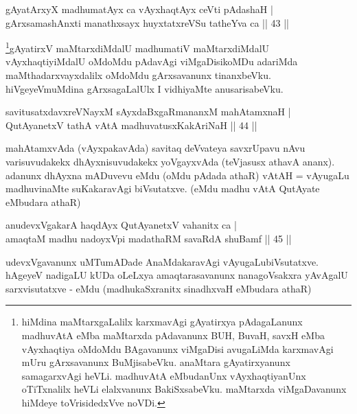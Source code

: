 \begin{shl}
gAyatArxyX madhumatAyx ca vAyxhaqtAyx ceVti pAdashaH | \\
gArxsamashAnxti manathxsayx huyxtatxreVSu tatheYva ca \hfill|| 43 || 
\end{shl}

\begin{artha}
\footnote{hiMdina maMtarxgaLalilx karxmavAgi gAyatirxya 
pAdagaLanunx madhuvAtA eMba maMtarxda pAdavanunx BUH, BuvaH, savxH 
eMba vAyxhaqtiya oMdoMdu BAgavanunx viMgaDisi avugaLiMda karxmavAgi 
mUru gArxsavanunx BuMjisabeVku. anaMtara gAyatirxyanunx samagarxvAgi 
heVLi. madhuvAtA eMbudanUnx vAyxhaqtiyanUnx oTiTxnalilx heVLi 
elalxvanunx BakiSxsabeVku. maMtarxda viMgaDavanunx hiMdeye 
toVrisidedxVve noVDi.}gAyatirxV maMtarxdiMdalU madhumatiV maMtarxdiMdalU 
vAyxhaqtiyiMdalU oMdoMdu pAdavAgi viMgaDisikoMDu adariMda 
maMthadarxvayxdalilx oMdoMdu gArxsavanunx tinanxbeVku. hiVgeyeV\break muMdina 
gArxsagaLalUlx I vidhiyaMte anusarisabeVku.
\end{artha}


\begin{shl}
savitusatxdavxreVNayxM sAyxdaBxgaRmananxM mahAtamxnaH | \\
QutAyanetxV tathA vAtA madhuvatusxKakAriNaH \hfill|| 44 || 
\end{shl}

\begin{artha}
mahAtamxvAda (vAyxpakavAda) savitaq deVvateya savxrUpavu nAvu 
varisuvudakekx dhAyxnisuvudakekx yoVgayxvAda (teVjasusx athavA ananx). 
adanunx dhAyxna mADuvevu eMdu (oMdu pAdada athaR) vAtAH = vAyugaLu 
madhuvinaMte suKakaravAgi biVsutatxve. (eMdu madhu vAtA QutAyate 
eMbudara athaR)
\end{artha}


\begin{shl}
anudevxVgakarA haqdAyx QutAyanetxV vahanitx ca | \\
amaqtaM madhu nadoyxV\s pi madathaRM savaRdA shuBamf \hfill|| 45 || 
\end{shl}

\begin{artha}
udevxVgavanunx uMTumADade AnaMdakaravAgi vAyugaLu\break biVsutatxve. hAgeyeV 
nadigaLU kUDa oLeLxya amaqtarasavanunx nanagoVsakxra yAvAgalU 
sarxvisutatxve - eMdu (madhukaSxranitx sinadhxvaH eMbudara athaR)
\end{artha}

